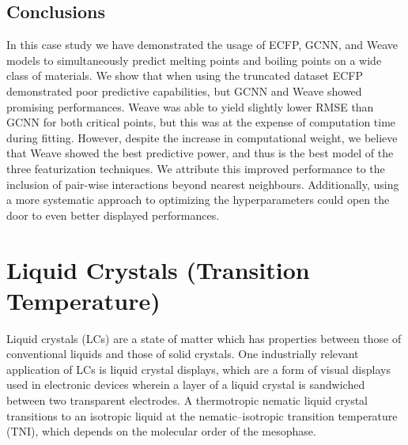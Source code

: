\documentclass[book.tex]{subfiles}
\begin{document}
\subsection{Conclusions}
In this case study we have demonstrated the usage of ECFP, GCNN, and Weave models to simultaneously predict melting points and boiling points on a wide class of materials. We show that when using the truncated dataset ECFP demonstrated poor predictive capabilities, but GCNN and Weave showed promising performances. Weave was able to yield slightly lower RMSE than GCNN for both critical points, but this was at the expense of computation time during fitting. However, despite the increase in computational weight, we believe that Weave showed the best predictive power, and thus is the best model of the three featurization techniques. We attribute this improved performance to the inclusion of pair-wise interactions beyond nearest neighbours. Additionally, using a more systematic approach to optimizing the hyperparameters could open the door to even better displayed performances. %

\section{Liquid Crystals (Transition Temperature)}
Liquid crystals (LCs) are a state of matter which has properties between those of conventional liquids and those of solid crystals. One industrially relevant application of LCs is liquid crystal displays, which are a form of visual displays used in electronic devices wherein a layer of a liquid crystal is sandwiched between two transparent electrodes. A thermotropic nematic liquid crystal transitions to an isotropic liquid at the nematic–isotropic transition temperature (TNI), which depends on the molecular order of the mesophase. 
\end{document}

